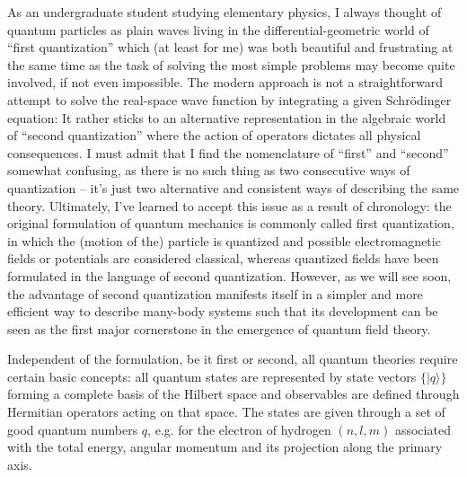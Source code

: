 As an undergraduate student studying elementary physics, I always thought of quantum particles as plain waves living in the differential-geometric world of ``first quan\-ti\-zation'' which (at least for me) was both beautiful and frustrating at the same time as the task of solving the most simple problems may become quite involved, if not even impossible.
The modern approach is not a straightforward attempt to solve the real-space wave function by integrating a given Schrödinger equation: It rather sticks to an alternative representation in the algebraic world of ``second quantization'' where the action of operators dictates all physical consequences.
I must admit that I find the nomenclature of ``first'' and ``second'' somewhat confusing, as there is no such thing as two consecutive ways of quantization -- it's just two alternative and consistent ways of describing the same theory.
Ultimately, I've learned to accept this issue as a result of chronology: the original formulation of quantum mechanics is commonly called first quantization, in which the (motion of the) particle is quantized and possible electromagnetic fields or potentials are considered classical, whereas quantized fields have been formulated in the language of second quantization.
However, as we will see soon, the advantage of second quantization manifests itself in a simpler and more efficient way to describe many-body systems such that its development can be seen as the first major cornerstone in the emergence of quantum field theory.

Independent of the formulation, be it first or second, all quantum theories require certain basic concepts:
all quantum states are represented by state vectors $\{|q\rangle\}$ forming a complete basis of the Hilbert space and observables are defined through Hermitian operators acting on that space.
The states are given through a set of good quantum numbers $q$, e.g. for the electron of hydrogen $(n,l,m)$ associated with the total energy, angular momentum and its projection along the primary axis.

